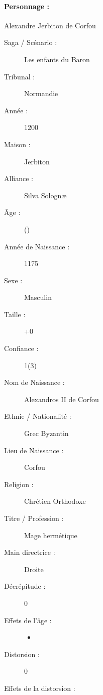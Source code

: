 \pagestyle{fancy}
\thispagestyle{plain}
{\Large \paragraph*{\Large Personnage :} Alexandre Jerbiton de Corfou}
\begin{multicols}{2}
\begin{description}
\item[Saga / Scénario :] Les enfants du Baron
\item[Tribunal :] Normandie
\item[Année :] 1200
\item[Maison :] Jerbiton
\item[Alliance :] Silva Solognæ
\item[Âge :] \magusage{} (\magusapparentage)
\item[Année de Naissance :] 1175
\item[Sexe :] Masculin
\item[Taille :] +0
\item[Confiance :] 1(3)
\columnbreak
\item[Nom de Naissance :] Alexandros II de Corfou
\item[Ethnie /  Nationalité :] Grec Byzantin
\item[Lieu de Naissance :] Corfou
\item[Religion :] Chrétien Orthodoxe
\item[Titre / Profession :] Mage hermétique
\item[Main directrice :] Droite
\vspace{-1em}
\end{description}
\end{multicols}
\begin{multicols}{2}
\begin{description}
\item[Décrépitude :] 0
\item[Effets de l'âge :]\hspace{0pt}
\begin{itemize}
\item
\end{itemize}
\columnbreak
\item[Distorsion :] 0
\item[Effets de la distorsion :]\hspace{0pt}
\magusscarslong
\end{description}
\end{multicols}
